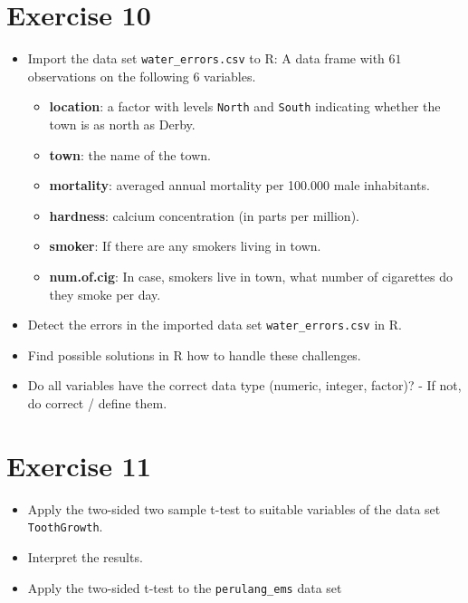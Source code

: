 \documentclass[11pt]{article}\usepackage[]{graphicx}\usepackage[]{color}
\begin{document}
\section*{Exercise 10}
\begin{itemize}
\item Import the data set \texttt{water\_errors.csv} to R:
A data frame with $61$ observations on the following $6$
variables.
\begin{itemize}
\item \textbf{location}: a factor with levels \texttt{North} and \texttt{South} indicating
whether the town is as north as Derby.
\item \textbf{town}: the name of the town.
\item \textbf{mortality}: averaged annual mortality per 100.000 male inhabitants.
\item \textbf{hardness}: calcium concentration (in parts per million).
\item \textbf{smoker}: If there are any smokers living in town.
\item \textbf{num.of.cig}: In case, smokers live in town, what number of
cigarettes do they smoke per day.
\end{itemize}

%
%
%
%
%
\item Detect the errors in the imported data set \texttt{water\_errors.csv} in R.

\item Find possible solutions in R how to handle these challenges.

\item Do all variables have the correct data type (numeric, integer, factor)?
- If not, do correct / define them.

\end{itemize}
%
\section*{Exercise 11}
\begin{itemize}
\item Apply the two-sided two sample t-test to suitable variables of the data set \texttt{ToothGrowth}.

\item Interpret the results.

\item Apply the two-sided t-test to the \texttt{perulang\_ems} data set

\end{itemize}
%
%
\end{document}
